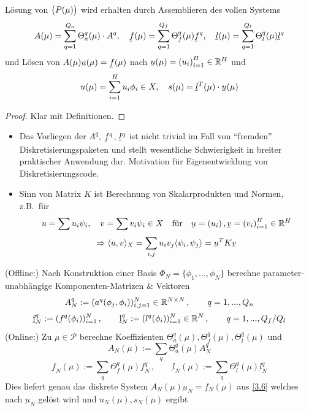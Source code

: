 \begin{kor}
\label{3.20}
	Lösung von $\big(P(\mu)\big)$ wird erhalten durch Assemblieren des vollen Systems
	\[
		A(\mu) = \sum_{q=1}^{Q_a} \Theta_a^q(\mu) \cdot A^q, \quad \ubar f(\mu) = \sum_{q=1}^{Q_f} \Theta_f^q(\mu) \ubar f^q, \quad \ubar l(\mu) = \sum_{q=1}^{Q_l} \Theta_l^q(\mu) \ubar l^q
	\]
	und Lösen von $A(\mu) \ubar u(\mu) = \ubar f(\mu)$ nach $\ubar u(\mu) = \seq{u_i}_{i=1}^H \in \R^H$ und
	\[
		u(\mu) = \sum_{i=1}^H u_i \phi_i \in X, \quad s(\mu) = \ubar l^T(\mu) \cdot \ubar u(\mu)
	\]

	\begin{proof}
		Klar mit Definitionen.
	\end{proof}
\end{kor}

\begin{bem} \beginwithlistbem
	\begin{itemize}
		\item Das Vorliegen der $A^q$, $\ubar f^q$, $\ubar l^q$ ist nicht trivial im Fall von ``fremden'' Diskretisierungspaketen und stellt wesentliche Schwierigkeit in breiter praktischer Anwendung dar.
			Motivation für Eigenentwicklung von Diskretisierungscode.
		\item Sinn von Matrix $K$ ist Berechnung von Skalarprodukten und Normen, z.B.\ für
			\[
				u = \sum u_i \psi_i, \quad v = \sum v_i \psi_i \in X \quad \text{für} \quad \ubar u = \seq{u_i}, \ubar v = \seq{v_i}_{i=1}^H \in \R^H
			\]
			\[
				\Rightarrow \dotp{u}{v}_X = \sum_{i,j} u_i v_j \dotp{\psi_i}{\psi_j} = \ubar u^T K \ubar v
			\]
	\end{itemize}
\end{bem}

\begin{kor}
\label{3.21}
(Offline:) Nach Konstruktion einer Basis $\Phi_N = \{\phi_1,...,\phi_N\}$ berechne parameter-unabhängige Komponenten-Matrizen \& Vektoren
\[
	A_N^q := (a^q(\phi_j,\phi_i))_{i,j = 1}^N \in \R^{N \times N} \, , \qquad q = 1,...,Q_n
\]
\[
	\underbar f_N^q := (f^q(\phi_i))_{i=1}^N \, , \qquad 	\underbar l_N^q := (l^q(\phi_i))_{i=1}^N \in \R^N \, , \qquad q = 1,...,Q_f/Q_l
\]
(Online:) Zu $\mu \in \mathcal{P}$ berechne Koeffizienten $\Theta_a^q(\mu), \Theta_f^q(\mu), \Theta_l^q(\mu)$ und 
\[
	A_N (\mu) := \sum_q  \Theta_a^q(\mu) A_N^q
\]
\[
	\underbar f_N (\mu) := \sum_q \Theta_f^q(\mu) \underbar f_N^q \, , \qquad \underbar l_N (\mu) := \sum_q \Theta_l^q(\mu) \underbar l_N^q
\]
Dies liefert genau das diskrete System $A_N(\mu) \underbar u_N = f_N(\mu)$ aus \ref{3.6} welches nach $\underbar u_N$ gelöst wird und $u_N(\mu), s_N(\mu)$ ergibt
\end{kor}

